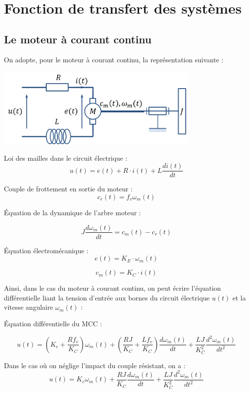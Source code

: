 \documentclass[11pt,oneside]{article}
\begin{document}
\tableofcontents

 \renewcommand{\baselinestretch}{1.2}
\setlength{\parskip}{2ex plus 0.5ex minus 0.2ex}



\section{Fonction de transfert des systèmes}
\subsection{Le moteur à courant continu}

On adopte, pour le moteur à courant continu, la représentation suivante :
\begin{center}
\includegraphics[width=10cm]{png/modele_mcc.png} 
\end{center}

\begin{multicols}{2}
Loi des mailles dans le circuit électrique : 
$$
u(t)=e(t)+R\cdot i(t) + L\dfrac{di(t)}{dt}
$$

Couple de frottement en sortie du moteur : 
$$
c_r(t) = f_v \omega_m(t)
$$



Équation de la dynamique de l'arbre moteur :

$$
J\dfrac{d\omega_m(t)}{dt} = c_m(t) - c_r(t)
$$

Équation électromécanique :
$$
e(t)=K_E \cdot \omega_m(t)
$$

$$
c_m(t)=K_C \cdot i(t)
$$
\end{multicols}

Ainsi, dans le cas du moteur à courant continu, on peut écrire l'équation différentielle liant la tension d'entrée aux bornes du circuit électrique $u(t)$ et la vitesse angulaire $\omega_m(t)$ :

\begin{exemple}
Équation différentielle du MCC :

$$
u(t)= 
 \left( K_e + \dfrac{R f_v}{K_C}\right) \omega_m(t)
+\left( \dfrac{RJ}{K_C} + \dfrac{Lf_v}{K_C} \right)\dfrac{d\omega_m(t)}{dt} 
+\dfrac{LJ}{K_C^2} \dfrac{d^2\omega_m(t)}{dt^2}  
$$

Dans le cas où on néglige l'impact du couple résistant, on a :
$$
u(t)= 
 K_e \omega_m(t)
 +\dfrac{RJ}{K_C} \dfrac{d\omega_m(t)}{dt} 
+\dfrac{LJ}{K_C^2} \dfrac{d^2\omega_m(t)}{dt^2}  
$$
\end{exemple}
\end{document}
